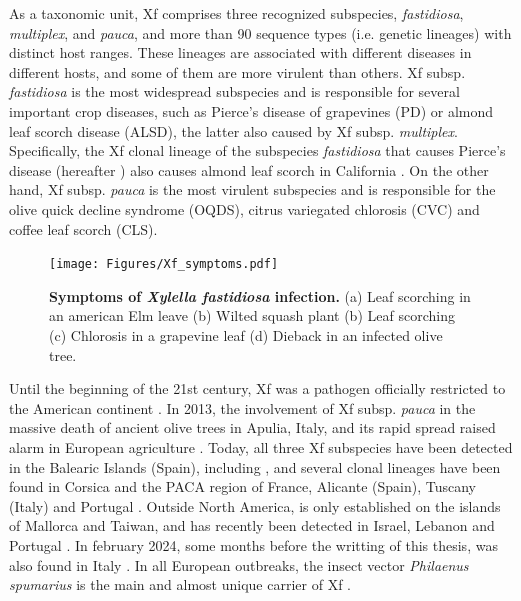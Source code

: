 As a taxonomic unit, Xf comprises three recognized subspecies,
\textit{fastidiosa}, \textit{multiplex}, and \textit{pauca}, and more than 90
sequence types (i.e. genetic lineages) with distinct host ranges.
These lineages are associated with different diseases in different hosts, and
some of them are more virulent than others. Xf subsp. \textit{fastidiosa} is
the most widespread subspecies and is responsible for several important crop
diseases, such as Pierce's disease of grapevines (PD) or almond leaf scorch
disease (ALSD), the latter also caused by Xf subsp. \textit{multiplex}.
Specifically, the Xf clonal lineage of the subspecies \textit{fastidiosa}
that causes Pierce's disease (hereafter \xf) also causes almond leaf scorch in
California \cite{almeida2003biological}. On the other hand, Xf subsp.
\textit{pauca} is the most virulent subspecies and is responsible for the olive
quick decline syndrome (OQDS), citrus variegated chlorosis (CVC) and coffee
leaf scorch (CLS).

\begin{figure}[H]
  \centering
  \texttt{[image: Figures/Xf\_symptoms.pdf]}
  \caption[Symptoms of \textit{Xylella fastidiosa} infection]{
    \textbf{Symptoms of \textit{Xylella fastidiosa} infection.} (a) Leaf
    scorching in an american Elm leave (b) Wilted squash plant (b) Leaf
    scorching (c) Chlorosis in a grapevine leaf (d) Dieback in an infected
    olive tree.}
  \label{fig:Xylella}
\end{figure}

Until the beginning of the 21st century, Xf was a pathogen officially
restricted to the American continent \cite{almeida2015plant}. In 2013, the
involvement of Xf subsp. \textit{pauca} in the massive death of ancient olive
trees in Apulia, Italy, and its rapid spread raised alarm in European
agriculture \cite{saponari2013identification}. Today, all three Xf subspecies
have been detected in the Balearic Islands (Spain), including \xf{}, and
several clonal lineages have been found in Corsica and the PACA region of
France, Alicante (Spain), Tuscany (Italy) and Portugal
\cite{olmo2021landscape,denance2017several,marco2021evidence}. Outside North
America, \xf{} is only established on the islands of Mallorca and Taiwan, and
has recently been detected in Israel, Lebanon and Portugal
\cite{zecharia2022xylella,carvalho2022dispersion}. In february 2024, some
months before the writting of this thesis, \xf{} was also found in Italy
\cite{Xf_detection_italy}. In all European outbreaks, the insect vector
\textit{Philaenus spumarius} is the main and almost unique carrier of Xf
\cite{cornara2018philaenus}.

